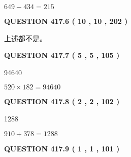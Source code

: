 \documentclass{ctexart}
\begin{document}
 
\noindent{}

$ %
649 -  %
434=   %
215$
 
 
  
\vspace{0.2in}
  
{\textbf{\Large{QUESTION
417.6 
 ( 10 , 10 , 202 )
}}}
  
  
 
 
\noindent{}
 
 
 上述都不是。
 
 
 
 
  
\vspace{0.2in}
  
{\textbf{\Large{QUESTION
417.7 
 ( 5 , 5 , 105 )
}}}
  
  
 
 
\noindent{}

94640
 
 
 
 
\noindent{}

$ %
520 \times  %
182=   %
94640$
 
 
  
\vspace{0.2in}
  
{\textbf{\Large{QUESTION
417.8 
 ( 2 , 2 , 102 )
}}}
  
  
 
 
\noindent{}

1288
 
 
 
 
\noindent{}

$ %
910 +  %
378=   %
1288$
 
 
  
\vspace{0.2in}
  
{\textbf{\Large{QUESTION
417.9 
 ( 1 , 1 , 101 )
}}}
  
  
 
 
\noindent{}
\end{document}
